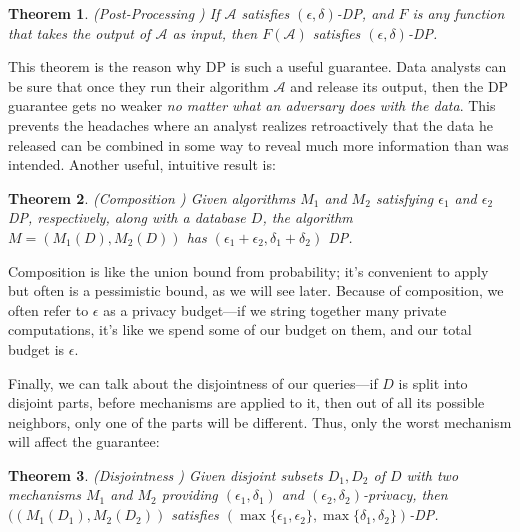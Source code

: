 \documentclass[11pt]{article}
\newtheorem{theorem}{Theorem}
\begin{document}
\begin{theorem}
(Post-Processing \cite{Dwork:2006}) If $\mathcal{A}$ satisfies $(\epsilon, \delta)$-DP, and $F$ is any function that takes the output of $\mathcal{A}$ as input, then $F(\mathcal{A})$ satisfies $(\epsilon, \delta)$-DP.
\end{theorem}
This theorem is the reason why DP is such a useful guarantee. Data analysts can be sure that once they run their algorithm $\mathcal{A}$ and release its output, then the DP guarantee gets no weaker \emph{no matter what an adversary does with the data}. This prevents the headaches where an analyst realizes retroactively that the data he released can be combined in some way to reveal much more information than was intended. Another useful, intuitive result is:

\begin{theorem} \label{thm:comp}
(Composition \cite{Dwork:2006}) Given algorithms $M_1$ and $M_2$ satisfying $\epsilon_1$ and $\epsilon_2$ DP, respectively, along with a database $D$, the algorithm $M = (M_1(D), M_2(D))$ has $(\epsilon_1+\epsilon_2, \delta_1+\delta_2)$ DP.
\end{theorem}
Composition is like the union bound from probability; it's convenient to apply but often is a pessimistic bound, as we will see later. Because of composition, we often refer to $\epsilon$ as a privacy budget---if we string together many private computations, it's like we spend some of our budget on them, and our total budget is $\epsilon$.

Finally, we can talk about the disjointness of our queries---if $D$ is split into disjoint parts, before mechanisms are applied to it, then out of all its possible neighbors, only one of the parts will be different. Thus, only the worst mechanism will affect the guarantee:
\begin{theorem}\label{thm:disj}
(Disjointness \cite{Dwork:2006}) Given disjoint subsets $D_1, D_2$ of $D$ with two mechanisms $M_1$ and $M_2$ providing $(\epsilon_1, \delta_1)$ and $(\epsilon_2, \delta_2)$-privacy, then $((M_1(D_1), M_2(D_2))$ satisfies $(\max\{\epsilon_1, \epsilon_2\}, \max\{\delta_1, \delta_2\})$-DP.
\end{theorem}
\end{document}
